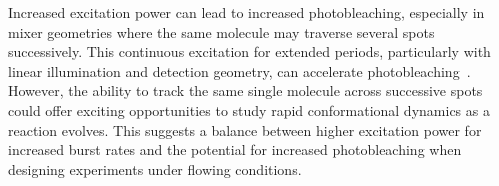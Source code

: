 Increased excitation power can lead to increased photobleaching, especially in mixer geometries where the same molecule may traverse several spots successively.
This continuous excitation for extended periods, particularly with linear illumination and detection geometry, can accelerate photobleaching~\cite{eggeling_AC_1998,eggeling_JPCA_2006,kong_JACS_2007}.
However, the ability to track the same single molecule across successive spots could offer exciting opportunities to study rapid conformational dynamics as a reaction evolves. 
This suggests a balance between higher excitation power for increased burst rates and the potential for increased photobleaching when designing experiments under flowing conditions.

